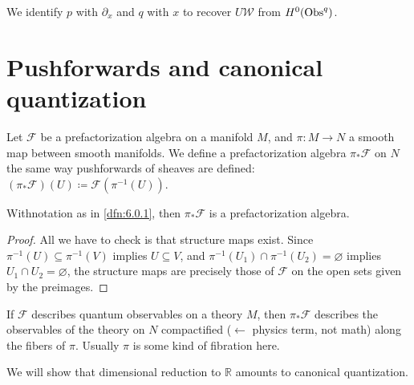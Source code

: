 
\begin{remark}
	We identify $p$ with $\partial _x$ and $q$ with $x$ to recover $U\mathcal{W} $ from $H^0(\operatorname{Obs}^q)$.
\end{remark}


\chapter{Pushforwards and canonical quantization}

\begin{definition}\label{dfn:6.0.1}
	Let $\mathcal{F}$ be a prefactorization algebra on a manifold $M$, and $\pi : M \to N$ a smooth map between smooth manifolds. We define a prefactorization algebra $\pi _*\mathcal{F} $ on $N$ the same way pushforwards of sheaves are defined: $(\pi _*\mathcal{F} )(U) \coloneqq \mathcal{F} (\pi ^{-1} (U))$.
\end{definition}

\begin{lemma}\label{lma:6.0.2}
	Withnotation as in \cref{dfn:6.0.1}, then $\pi _*\mathcal{F} $ is a prefactorization algebra.
\end{lemma}
\begin{proof}
	All we have to check is that structure maps exist. Since $\pi ^{-1} (U) \subseteq \pi ^{-1} (V)$ implies $U\subseteq V$, and $\pi ^{-1} (U_1) \cap \pi ^{-1} (U_2) =\varnothing $ implies $U_1 \cap U_2=\varnothing $, the structure maps are precisely those of $\mathcal{F} $ on the open sets given by the preimages.
\end{proof}

\begin{intuition}
	If $\mathcal{F} $ describes quantum observables on a theory $M$, then $\pi _*\mathcal{F} $ describes the observables of the theory on $N$ compactified ($\leftarrow$ physics term, not math) along the fibers of $\pi $. Usually $\pi $ is some kind of fibration here.
\end{intuition}

We will show that dimensional reduction to $\mathbb{R} $ amounts to canonical quantization.

